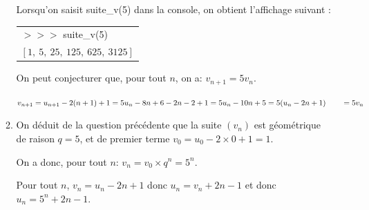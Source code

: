 \begin{enumerate}
\begin{enumerate}

Lorsqu'on saisit {\ttfamily suite\_v(5)} dans la console, on obtient l'affichage suivant :

\begin{center}
\begin{tabular}{>{\ttfamily} l}
$>>>$ suite\_v(5)\\
$[1,~5,~25,~125,~625,~3125]$\\
\end{tabular}
\end{center}


On peut conjecturer que, pour tout $n$, on a: $v_{n+1}=5v_n$.


$v_{n+1}=u_{n+1}-2(n+1)+1 = 5u_n -8n +6 -2n-2+1=5u_n-10n+5= 5(u_n-2n+1)\\
\phantom{v_{n+1}}
=5v_n$

		\item %
On déduit de la question précédente que  la suite $(v_n)$ est géométrique de raison $q=5$, et de premier terme $v_0=u_0-2\times 0+1=1$. 

On a donc, pour tout $n$: $v_n = v_0\times q^n = 5^n$.

Pour tout $n$, $v_n=u_n-2n+1$ donc $u_n=v_n+2n-1$ et donc $u_n= 5^n +2n-1$.
	\end{enumerate}
\end{enumerate}

\bigskip

